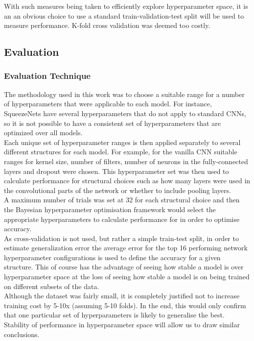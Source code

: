 \documentclass{article}
\begin{document}
 With such measures being taken to efficiently explore hyperparameter space, it is an an obvious choice to use a standard train-validation-test split will be used to measure performance. K-fold cross validation was deemed too costly.\\




\subsection{Evaluation}

\subsubsection{Evaluation Technique}
The methodology used in this work was to choose a suitable range for a number of hyperparameters that were applicable to each model. For instance, SqueezeNets have several hyperparameters that do not apply to standard CNNs, so it is not possible to have a consistent set of hyperparameters that are optimized over all  models. \\

Each unique set of hyperparameter ranges is then applied separately to several different structures for each model. For example, for the vanilla CNN suitable ranges for kernel size, number of filters, number of neurons in the fully-connected layers and dropout were chosen. This hyperparameter set was then used to calculate performance for structural choices such as how many layers were used in the convolutional parts of the network or whether to include pooling layers. \\

A maximum number of trials was set at 32 for each structural choice and then the Bayesian hyperparameter optimisation framework would select the appropriate hyperparameters to calculate performance for in order to optimise accuracy. \\

As cross-validation is not used, but rather a simple train-test split, in order to estimate generalization error the average error for the top 16 performing network hyperparameter configurations is used to define the accuracy for a given structure. This of course has the advantage of seeing how stable a model is over hyperparameter space at the loss of seeing how stable a model is on being trained on different subsets of the data.\\

Although the dataset was fairly small, it is completely justified not to increase training cost by 5-10x (assuming 5-10 folds). In the end, this would only confirm that one particular set of hyperparameters is likely to generalise the best. Stability of performance in hyperparameter space will allow us to draw similar conclusions.\\
\end{document}
